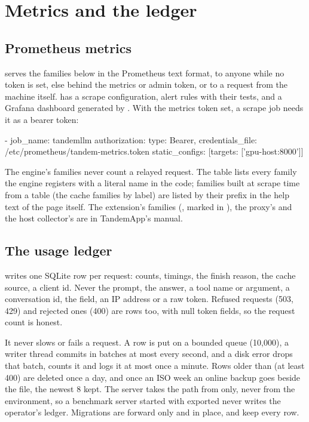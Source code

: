 \chapter{Metrics and the ledger}\label{ch:ref-metrics}

\section{Prometheus metrics}

 serves the families below in the Prometheus text format, to anyone while no token is set, else behind the metrics or admin token, or to a request from the machine itself.  has a scrape configuration, alert rules with their tests, and a Grafana dashboard generated by . With the metrics token set, a scrape job needs it as a bearer token:

\begin{plain}
- job_name: tandemllm
  authorization: {type: Bearer, credentials_file: /etc/prometheus/tandem-metrics.token}
  static_configs: [{targets: ['gpu-host:8000']}]
\end{plain}

The engine's families never count a relayed request. The table lists every family the engine registers with a literal name in the code; families built at scrape time from a table (the cache families by  label) are listed by their prefix in the help text of the page itself. The extension's families (, marked  in ), the proxy's and the host collector's are in TandemApp's manual.



\section{The usage ledger}\label{sec:ledger}

 writes one SQLite row per request: counts, timings, the finish reason, the cache source, a client id. Never the prompt, the answer, a tool name or argument, a conversation id, the  field, an IP address or a raw token. Refused requests (503, 429) and rejected ones (400) are rows too, with null token fields, so the request count is honest.

It never slows or fails a request. A row is put on a bounded queue (10,000), a writer thread commits in batches at most every second, and a disk error drops that batch, counts it and logs it at most once a minute. Rows older than  (at least 400) are deleted once a day, and once an ISO week an online backup goes beside the file, the newest 8 kept. The server takes the path from  only, never from the environment, so a benchmark server started with  exported never writes the operator's ledger. Migrations are forward only and in place, and keep every row.

